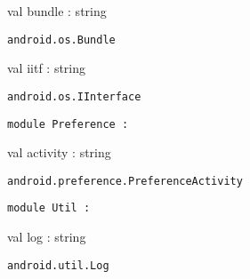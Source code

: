 \documentclass[11pt]{article}
\begin{document}
\begin{ocamldocsigend}


\label{val:Android.OS.bundle}\begin{ocamldoccode}
val bundle : string
\end{ocamldoccode}
\begin{ocamldocdescription}
{\tt{android.os.Bundle}}


\end{ocamldocdescription}


\label{val:Android.OS.iitf}\begin{ocamldoccode}
val iitf : string
\end{ocamldoccode}
\begin{ocamldocdescription}
{\tt{android.os.IInterface}}


\end{ocamldocdescription}
\end{ocamldocsigend}






\begin{ocamldoccode}
{\tt{module }}{\tt{Preference}}{\tt{ : }}\end{ocamldoccode}
\label{module:Android.Preference}

\begin{ocamldocsigend}


\label{val:Android.Preference.activity}\begin{ocamldoccode}
val activity : string
\end{ocamldoccode}
\begin{ocamldocdescription}
{\tt{android.preference.PreferenceActivity}}


\end{ocamldocdescription}
\end{ocamldocsigend}






\begin{ocamldoccode}
{\tt{module }}{\tt{Util}}{\tt{ : }}\end{ocamldoccode}
\label{module:Android.Util}

\begin{ocamldocsigend}


\label{val:Android.Util.log}\begin{ocamldoccode}
val log : string
\end{ocamldoccode}
\begin{ocamldocdescription}
{\tt{android.util.Log}}


\end{ocamldocdescription}
\end{ocamldocsigend}
\end{document}
